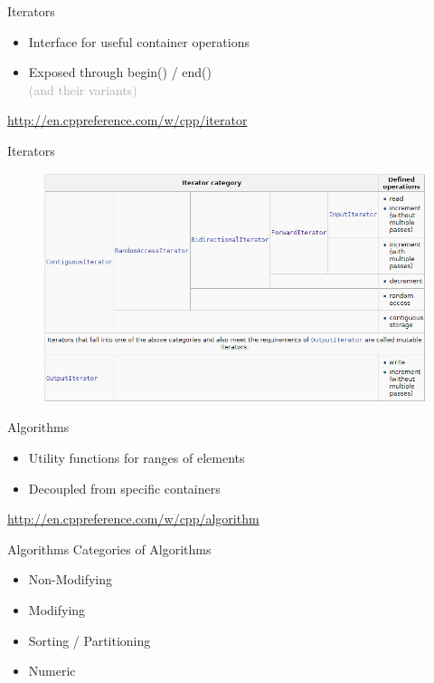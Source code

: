 \documentclass{beamer}
\begin{document}
\begin{frame}{Iterators}
	\begin{itemize}
		\item Interface for useful container operations
		\item Exposed through begin() / end() \\
			\textcolor{darkgray}{(and their variants)}
	\end{itemize}
	
	\bigskip
	
	\begin{center}
		\url{http://en.cppreference.com/w/cpp/iterator}
	\end{center}
\end{frame}

\begin{frame}{Iterators}
	\begin{figure}
		\centering
		\includegraphics[width=\linewidth]{IteratorTypes}
	\end{figure}
\end{frame}

\begin{frame}{Algorithms}
	\begin{itemize}
		\item Utility functions for ranges of elements
		\item Decoupled from specific containers
	\end{itemize}
	
	\bigskip
	
	\begin{center}
		\url{http://en.cppreference.com/w/cpp/algorithm}
	\end{center}
\end{frame}

\begin{frame}{Algorithms}
	Categories of Algorithms
	\begin{itemize}
		\item Non-Modifying
		\item Modifying
		\item Sorting / Partitioning
		\item Numeric
	\end{itemize}
\end{frame}
\end{document}
